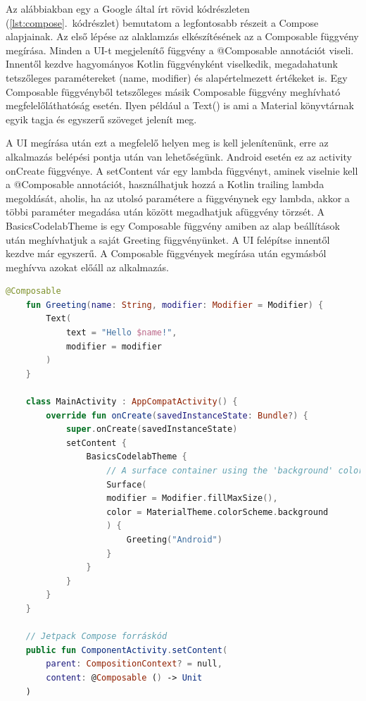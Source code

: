 Az alábbiakban egy a Google által írt rövid kódrészleten (\ref{lst:compose}.~kódrészlet) bemutatom a legfontosabb részeit a Compose alapjainak.\cite{BasicCodelab}
Az első lépése az alaklamzás elkészítésének az a Composable függvény megírása.
Minden a UI-t megjelenítő függvény a @Composable annotációt viseli.
Innentől kezdve hagyományos Kotlin függvényként viselkedik, megadahatunk tetszőleges paramétereket (name, modifier) és alapértelmezett értékeket is.
Egy Composable függvényből tetszőleges másik Composable függvény meghívható megfelelőláthatóság esetén.
Ilyen például a Text() is ami a Material könyvtárnak egyik tagja és egyszerű szöveget jelenít meg.

A UI megírása után ezt a megfelelő helyen meg is kell jelenítenünk, erre az alkalmazás belépési pontja után van lehetőségünk.
Android esetén ez az activity onCreate függvénye.
A setContent vár egy lambda függvényt, aminek viselnie kell a @Composable annotációt, használhatjuk hozzá a Kotlin trailing lambda megoldását, aholis, ha az utolsó paramétere a függvénynek egy lambda, akkor a többi paraméter megadása után {} között megadhatjuk afüggvény törzsét.
A BasicsCodelabTheme is egy Composable függvény amiben az alap beállítások után meghívhatjuk a saját Greeting függvényünket.
A UI felépítse innentől kezdve már egyszerű.
A Composable függvények megírása után egymásból meghívva azokat előáll az alkalmazás.

\begin{lstlisting}[caption={Példa a Compose használatára.}, label={lst:compose}, language=Kotlin]
    @Composable
    fun Greeting(name: String, modifier: Modifier = Modifier) {
        Text(
            text = "Hello $name!",
            modifier = modifier
        )
    }

    class MainActivity : AppCompatActivity() {
        override fun onCreate(savedInstanceState: Bundle?) {
            super.onCreate(savedInstanceState)
            setContent {
                BasicsCodelabTheme {
                    // A surface container using the 'background' color from the theme
                    Surface(
                    modifier = Modifier.fillMaxSize(),
                    color = MaterialTheme.colorScheme.background
                    ) {
                        Greeting("Android")
                    }
                }
            }
        }
    }

    // Jetpack Compose forráskód
    public fun ComponentActivity.setContent(
        parent: CompositionContext? = null,
        content: @Composable () -> Unit
    )
\end{lstlisting}


